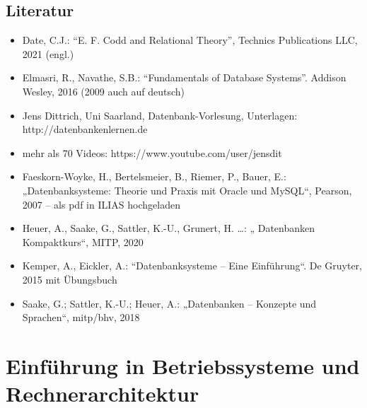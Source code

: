 \hypertarget{literaturpathlabelmi-2017modulbeschreibungen-bachelorba_datenbanken1}{%
\section*{Literatur\label{/mi-2017/modulbeschreibungen-bachelor/BA_Datenbanken1}}\label{literaturpathlabelmi-2017modulbeschreibungen-bachelorba_datenbanken1}}

\begin{itemize}
\tightlist
\item
  Date, C.J.: ``E. F. Codd and Relational Theory'', Technics
  Publications LLC, 2021 (engl.)
\item
  Elmasri, R., Navathe, S.B.: ``Fundamentals of Database Systems''.
  Addison Wesley, 2016 (2009 auch auf deutsch)
\item
  Jens Dittrich, Uni Saarland, Datenbank-Vorlesung, Unterlagen:
  http://datenbankenlernen.de
\item
  mehr als 70 Videos: https://www.youtube.com/user/jensdit
\item
  Faeskorn-Woyke, H., Bertelsmeier, B., Riemer, P., Bauer, E.:
  „Datenbanksysteme: Theorie und Praxis mit Oracle und MySQL``, Pearson,
  2007 -- als pdf in ILIAS hochgeladen
\item
  Heuer, A., Saake, G., Sattler, K.-U., Grunert, H. \ldots: „
  Datenbanken Kompaktkurs``, MITP, 2020
\item
  Kemper, A., Eickler, A.: ``Datenbanksysteme -- Eine Einführung``. De
  Gruyter, 2015 mit Übungsbuch
\item
  Saake, G.; Sattler, K.-U.; Heuer, A.: „Datenbanken -- Konzepte und
  Sprachen``, mitp/bhv, 2018
\end{itemize}

\hypertarget{einfuxfchrung-in-betriebssysteme-und-rechnerarchitekturpathlabelmi-2017modulbeschreibungen-bachelorba_einfhrunginbetriebssystemeundrechnerarchitektur}{%
\chapter{Einführung in Betriebssysteme und
Rechnerarchitektur\label{/mi-2017/modulbeschreibungen-bachelor/BA_EinfhrunginBetriebssystemeundRechnerarchitektur}}\label{einfuxfchrung-in-betriebssysteme-und-rechnerarchitekturpathlabelmi-2017modulbeschreibungen-bachelorba_einfhrunginbetriebssystemeundrechnerarchitektur}}

